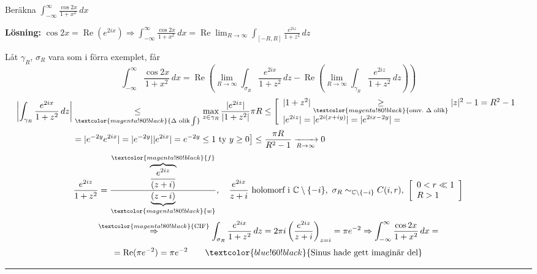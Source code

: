 \begin{example}
Beräkna $\displaystyle\int_{-\infty}^{\infty} \frac{\cos 2x}{1 + x^2}\,dx$

\textbf{Lösning:} $\cos 2x = \operatorname{Re}(e^{2ix}) \Rightarrow \displaystyle\int_{-\infty}^{\infty} \frac{\cos 2x}{1 + x^2}\,dx = \operatorname{Re} \lim_{R \to \infty} \int_{[-R, R]} \frac{e^{2iz}}{1 + z^2}\,dz$

Låt $\gamma_R$, $\sigma_R$ vara som i förra exemplet, får
\[ \int_{-\infty}^{\infty} \frac{\cos 2x}{1 + x^2}\,dx = \operatorname{Re}\left( \lim_{R \to \infty} \int_{\sigma_R} \frac{e^{2ix}}{1 + z^2}\,dz - \operatorname{Re}\left( \lim_{R \to \infty} \int_{\gamma_R} \frac{e^{2iz}}{1 + z^2}\,dz \right) \right) \]
\begin{align*}
  \left| \int_{\gamma_R} \frac{e^{2ix}}{1 + z^2}\,dz \right| &\underset{\textcolor{magenta!80!black}{\Delta\text{ olik} \int}}{\le} \max_{z \in \gamma_R} \frac{|e^{2iz}|}{|1 + z^2|} \pi R \le \left[ \begin{array}{l} |1 + z^2| \underset{\textcolor{magenta!80!black}{\text{omv.\ } \Delta \text{ olik}}}{\ge} |z|^2 - 1 = R^2 - 1 \\ |e^{2iz}| = |e^{2i(x + iy)}| = |e^{2ix - 2y}| = \end{array} \right. \\
  &\left. = |e^{-2y}e^{2ix}| = |e^{-2y}||e^{2ix}| = e^{-2y} \le 1 \text{ ty } y \ge 0 \right] \le \frac{\pi R}{R^2 - 1} \xrightarrow[R \to \infty]{} 0
\end{align*}
\[ \frac{e^{2iz}}{1 + z^2} = \frac{\overbrace{\frac{e^{2iz}}{(z + i)}}^{\textcolor{magenta!80!black}{f}}}{\underbrace{(z - i)}_{\textcolor{magenta!80!black}{w}}}, \quad \frac{e^{2ix}}{z + i} \text{ holomorf i } \mathbb{C} \setminus \{-i\}, \ \sigma_R \sim_{\mathbb{C} \setminus \{-i\}} C(i, r), \ \left[ \begin{array}{l} 0 < r \ll 1 \\ R > 1 \end{array} \right] \]
\[ \overset{\textcolor{magenta!80!black}{\text{CIF}}}{\Rightarrow} \int_{\sigma_R} \frac{e^{2ix}}{1 + z^2}\,dz = 2\pi i \left( \frac{e^{2iz}}{z + i} \right)_{z = i} = \pi e^{-2} \Rightarrow \int_{-\infty}^{\infty} \frac{\cos 2x}{1 + x^2}\,dx = \]
\[ = \operatorname{Re}(\pi e^{-2}) = \pi e^{-2} \qquad \textcolor{blue!60!black}{\text{Sinus hade gett imaginär del}} \]
\end{example}

\noindent\rule{\linewidth}{0.4pt}

